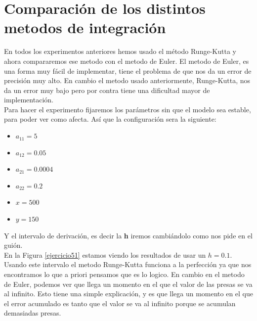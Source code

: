 \documentclass[12pt,a4paper]{article}
\begin{document}
\section{Comparación de los distintos metodos de integración}
En todos los experimentos anteriores hemos usado el método Runge-Kutta y ahora compararemos ese metodo con el metodo de Euler. El metodo de Euler, es una forma muy fácil de implementar, tiene el problema de que nos da un error de precisión muy alto. En cambio el metodo usado anteriormente, Runge-Kutta, nos da un error muy bajo pero por contra tiene una dificultad mayor de implementación. \\\newpage
Para hacer el experimento fijaremos los parámetros sin que el modelo sea estable, para poder ver como afecta. Así que la configuración sera la siguiente:
\begin{itemize}
	\item $a_{11} = 5 $
	\item $a_{12} = 0.05$
	\item $a_{21} = 0.0004$
	\item $a_{22} = 0.2$
	\item $x = 500$
	\item $y = 150$ 
\end{itemize}
Y el intervalo de derivación, es decir la \textbf{h} iremos cambiándolo como nos pide en el guión. \\
En la Figura \ref{ejercicio51}  estamos viendo los resultados de usar un $h=0.1$. Usando este intervalo el metodo Runge-Kutta funciona a la perfección ya que nos encontramos lo que a priori pensamos que es lo logico. En cambio en el metodo de Euler, podemos ver que llega un momento en el que el valor de las presas se va al infinito. Esto tiene una simple explicación, y es que llega un momento en el que el error acumulado es tanto que el valor se va al infinito porque se acumulan demasiadas presas. 
\end{document}
